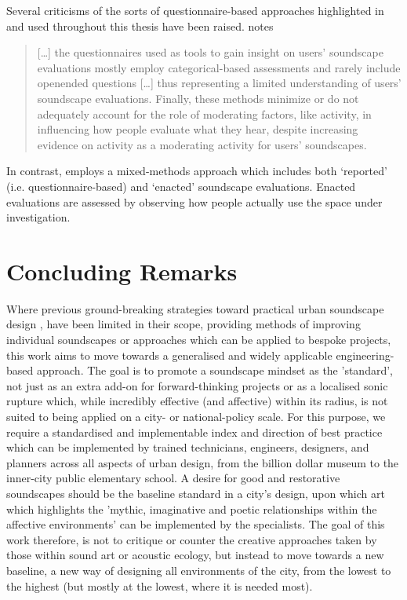 Several criticisms of the sorts of questionnaire-based approaches highlighted in \citet{ISO12913Part2} and used throughout this thesis have been raised. \citet{Bild2018Public} notes

\begin{quote}
  [\dots] the questionnaires used as tools to gain insight on users’ soundscape evaluations mostly employ categorical-based assessments and rarely include openended questions [\ldots] thus representing a limited understanding of users’ soundscape evaluations. Finally, these methods minimize or do not adequately account for the role of moderating factors, like activity, in influencing how people evaluate what they hear, despite increasing evidence on activity as a moderating activity for users' soundscapes.
\end{quote}

In contrast, \citet{Bild2018Public} employs a mixed-methods approach which includes both `reported' (i.e. questionnaire-based) and `enacted' soundscape evaluations. Enacted evaluations are assessed by observing how people actually use the space under investigation.  



\section{Concluding Remarks}

Where previous ground-breaking strategies toward practical urban soundscape design \citep{Lacey2019Noise}, have been limited in their scope, providing methods of improving individual soundscapes or approaches which can be applied to bespoke projects, this work aims to move towards a generalised and widely applicable engineering-based approach. The goal is to promote a soundscape mindset as the 'standard', not just as an extra add-on for forward-thinking projects or as a localised sonic rupture which, while incredibly effective (and affective) within its radius, is not suited to being applied on a city- or national-policy scale. For this purpose, we require a standardised and implementable index and direction of best practice which can be implemented by trained technicians, engineers, designers, and planners across all aspects of urban design, from the billion dollar museum to the inner-city public elementary school. A desire for good and restorative soundscapes should be the baseline standard in a city's design, upon which art which highlights the 'mythic, imaginative and poetic relationships within the affective environments' \citep{Lacey2019Noise} can be implemented by the specialists. The goal of this work therefore, is not to critique or counter the creative approaches taken by those within sound art or acoustic ecology, but instead to move towards a new baseline, a new way of designing all environments of the city, from the lowest to the highest (but mostly at the lowest, where it is needed most).
